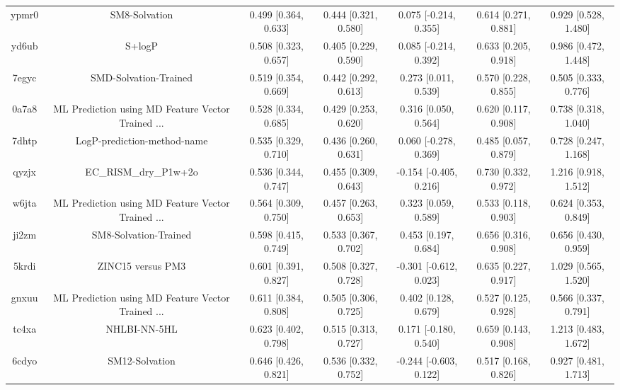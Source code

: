 \documentclass{article}
\begin{document}
\begin{center}
\begin{longtable}{|ccccccc|}
 ypmr0 &                                      SM8-Solvation &  0.499 [0.364, 0.633] &  0.444 [0.321, 0.580] &    0.075 [-0.214, 0.355] &  0.614 [0.271, 0.881] &    0.929 [0.528, 1.480] \\
 yd6ub &                                             S+logP &  0.508 [0.323, 0.657] &  0.405 [0.229, 0.590] &    0.085 [-0.214, 0.392] &  0.633 [0.205, 0.918] &    0.986 [0.472, 1.448] \\
 7egyc &                              SMD-Solvation-Trained &  0.519 [0.354, 0.669] &  0.442 [0.292, 0.613] &     0.273 [0.011, 0.539] &  0.570 [0.228, 0.855] &    0.505 [0.333, 0.776] \\
 0a7a8 &  ML Prediction using MD Feature Vector Trained ... &  0.528 [0.334, 0.685] &  0.429 [0.253, 0.620] &     0.316 [0.050, 0.564] &  0.620 [0.117, 0.908] &    0.738 [0.318, 1.040] \\
 7dhtp &                        LogP-prediction-method-name &  0.535 [0.329, 0.710] &  0.436 [0.260, 0.631] &    0.060 [-0.278, 0.369] &  0.485 [0.057, 0.879] &    0.728 [0.247, 1.168] \\
 qyzjx &                              EC\_RISM\_dry\_P1w+2o &  0.536 [0.344, 0.747] &  0.455 [0.309, 0.643] &   -0.154 [-0.405, 0.216] &  0.730 [0.332, 0.972] &    1.216 [0.918, 1.512] \\
 w6jta &  ML Prediction using MD Feature Vector Trained ... &  0.564 [0.309, 0.750] &  0.457 [0.263, 0.653] &     0.323 [0.059, 0.589] &  0.533 [0.118, 0.903] &    0.624 [0.353, 0.849] \\
 ji2zm &                              SM8-Solvation-Trained &  0.598 [0.415, 0.749] &  0.533 [0.367, 0.702] &     0.453 [0.197, 0.684] &  0.656 [0.316, 0.908] &    0.656 [0.430, 0.959] \\
 5krdi &                                  ZINC15 versus PM3 &  0.601 [0.391, 0.827] &  0.508 [0.327, 0.728] &   -0.301 [-0.612, 0.023] &  0.635 [0.227, 0.917] &    1.029 [0.565, 1.520] \\
 gnxuu &  ML Prediction using MD Feature Vector Trained ... &  0.611 [0.384, 0.808] &  0.505 [0.306, 0.725] &     0.402 [0.128, 0.679] &  0.527 [0.125, 0.928] &    0.566 [0.337, 0.791] \\
 tc4xa &                                       NHLBI-NN-5HL &  0.623 [0.402, 0.798] &  0.515 [0.313, 0.727] &    0.171 [-0.180, 0.540] &  0.659 [0.143, 0.908] &    1.213 [0.483, 1.672] \\
 6cdyo &                                     SM12-Solvation &  0.646 [0.426, 0.821] &  0.536 [0.332, 0.752] &   -0.244 [-0.603, 0.122] &  0.517 [0.168, 0.826] &    0.927 [0.481, 1.713] \\

\end{longtable}
\end{center}
\end{document}
